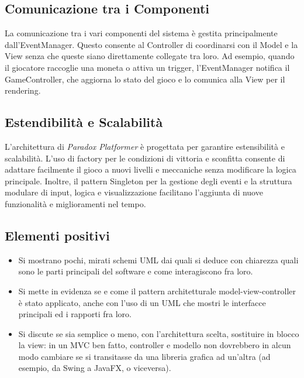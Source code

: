\documentclass[a4paper,12pt]{report}
\begin{document}
	\subsection{Comunicazione tra i Componenti}
	
	La comunicazione tra i vari componenti del sistema è gestita principalmente dall'EventManager. Questo consente al Controller di coordinarsi con il Model e la View senza che queste siano direttamente collegate tra loro. Ad esempio, quando il giocatore raccoglie una moneta o attiva un trigger, l'EventManager notifica il GameController, che aggiorna lo stato del gioco e lo comunica alla View per il rendering.
	
	\subsection{Estendibilità e Scalabilità}
	
	L'architettura di \textit{Paradox Platformer} è progettata per garantire estensibilità e scalabilità. L’uso di factory per le condizioni di vittoria e sconfitta consente di adattare facilmente il gioco a nuovi livelli e meccaniche senza modificare la logica principale. Inoltre, il pattern Singleton per la gestione degli eventi e la struttura modulare di input, logica e visualizzazione facilitano l'aggiunta di nuove funzionalità e miglioramenti nel tempo.
	
	\subsection*{Elementi positivi}
	\begin{itemize}
		\item Si mostrano pochi, mirati schemi UML dai quali si deduce con chiarezza quali sono le parti principali del software e come interagiscono fra loro.
		\item Si mette in evidenza se e come il pattern architetturale model-view-controller è stato applicato, anche con l'uso di un UML che mostri le interfacce principali ed i rapporti fra loro.
		\item Si discute se sia semplice o meno, con l'architettura scelta, sostituire in blocco la view: in un MVC ben fatto, controller e modello non dovrebbero in alcun modo cambiare se si transitasse da una libreria grafica ad un'altra (ad esempio, da Swing a JavaFX, o viceversa).
	\end{itemize}
	
\end{document}
